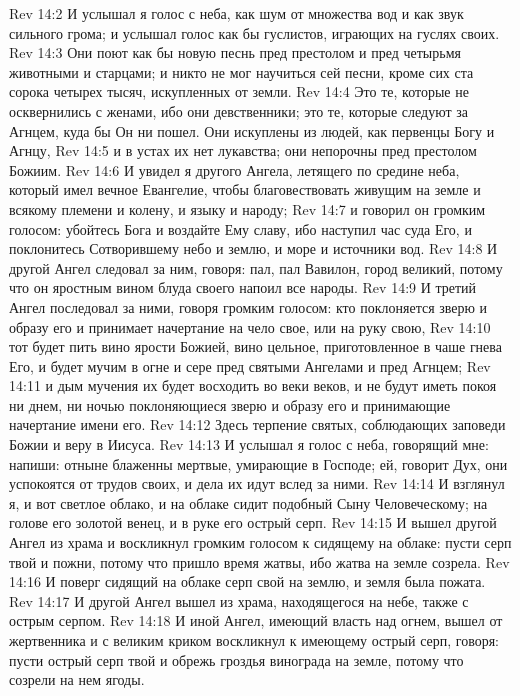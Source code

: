 \vs Rev 14:2 И услышал я голос с неба, как шум от множества вод и как звук сильного грома; и услышал голос как бы гуслистов, играющих на гуслях своих.
\vs Rev 14:3 Они поют как бы новую песнь пред престолом и пред четырьмя животными и старцами; и никто не мог научиться сей песни, кроме сих ста сорока четырех тысяч, искупленных от земли.
\vs Rev 14:4 Это те, которые не осквернились с женами, ибо они девственники; это те, которые следуют за Агнцем, куда бы Он ни пошел. Они искуплены из людей, как первенцы Богу и Агнцу,
\vs Rev 14:5 и в устах их нет лукавства; они непорочны пред престолом Божиим.
\rsbpar\vs Rev 14:6 И увидел я другого Ангела, летящего по средине неба, который имел вечное Евангелие, чтобы благовествовать живущим на земле и всякому племени и колену, и языку и народу;
\vs Rev 14:7 и говорил он громким голосом: убойтесь Бога и воздайте Ему славу, ибо наступил час суда Его, и поклонитесь Сотворившему небо и землю, и море и источники вод.
\vs Rev 14:8 И другой Ангел следовал за ним, говоря: пал, пал Вавилон, город великий, потому что он яростным вином блуда своего напоил все народы.
\vs Rev 14:9 И третий Ангел последовал за ними, говоря громким голосом: кто поклоняется зверю и образу его и принимает начертание на чело свое, или на руку свою,
\vs Rev 14:10 тот будет пить вино ярости Божией, вино цельное, приготовленное в чаше гнева Его, и будет мучим в огне и сере пред святыми Ангелами и пред Агнцем;
\vs Rev 14:11 и дым мучения их будет восходить во веки веков, и не будут иметь покоя ни днем, ни ночью поклоняющиеся зверю и образу его и принимающие начертание имени его.
\vs Rev 14:12 Здесь терпение святых, соблюдающих заповеди Божии и веру в Иисуса.
\rsbpar\vs Rev 14:13 И услышал я голос с неба, говорящий мне: напиши: отныне блаженны мертвые, умирающие в Господе; ей, говорит Дух, они успокоятся от трудов своих, и дела их идут вслед за ними.
\rsbpar\vs Rev 14:14 И взглянул я, и вот светлое облако, и на облаке сидит подобный Сыну Человеческому; на голове его золотой венец, и в руке его острый серп.
\vs Rev 14:15 И вышел другой Ангел из храма и воскликнул громким голосом к сидящему на облаке: пусти серп твой и пожни, потому что пришло время жатвы, ибо жатва на земле созрела.
\vs Rev 14:16 И поверг сидящий на облаке серп свой на землю, и земля была пожата.
\vs Rev 14:17 И другой Ангел вышел из храма, находящегося на небе, также с острым серпом.
\vs Rev 14:18 И иной Ангел, имеющий власть над огнем, вышел от жертвенника и с великим криком воскликнул к имеющему острый серп, говоря: пусти острый серп твой и обрежь гроздья винограда на земле, потому что созрели на нем ягоды.
